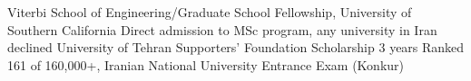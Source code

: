 
\begin{cvhonorlist}
    {Viterbi School of Engineering\slash Graduate School Fellowship,
     University of Southern California}
    {}
    {Direct admission to MSc program, any university in Iran}
    {declined}
    {University of Tehran Supporters' Foundation Scholarship}
    {3 years}
    {Ranked 161 of 160,000+, Iranian National University Entrance Exam (Konkur)}
    {}
\end{cvhonorlist}
